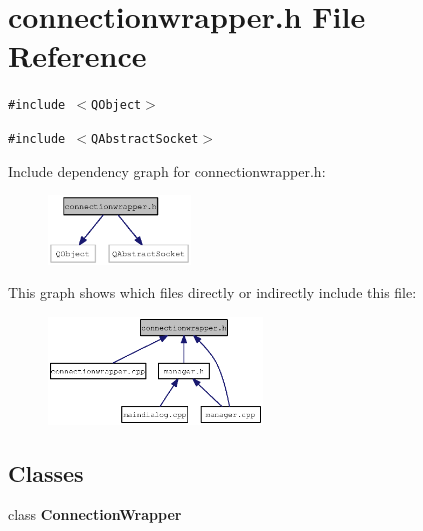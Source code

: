 \section{connectionwrapper.h File Reference}
\label{connectionwrapper_8h}
{\tt \#include $<$QObject$>$}\par
{\tt \#include $<$QAbstractSocket$>$}\par


Include dependency graph for connectionwrapper.h:\nopagebreak
\begin{figure}[H]
\begin{center}
\leavevmode
\includegraphics[width=107pt]{connectionwrapper_8h__incl}
\end{center}
\end{figure}


This graph shows which files directly or indirectly include this file:\nopagebreak
\begin{figure}[H]
\begin{center}
\leavevmode
\includegraphics[width=161pt]{connectionwrapper_8h__dep__incl}
\end{center}
\end{figure}
\subsection*{Classes}
\begin{CompactItemize}
\item 
class {\bf ConnectionWrapper}
\end{CompactItemize}
